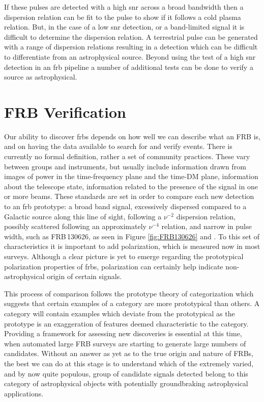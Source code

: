 \documentclass[a4paper,fleqn,usenatbib]{mnras}
\begin{document}
If these pulses are detected with a high \gls{snr} across a broad bandwidth then
a dispersion relation can be fit to the pulse to show if it follows a cold
plasma relation. But, in the case of a low \gls{snr} detection, or a
band-limited signal it is difficult to determine the dispersion relation. A
terrestrial pulse can be generated with a range of dispersion relations
resulting in a detection which can be difficult to differentiate from an
astrophysical source. Beyond using the test of a high \gls{snr} detection in an
\gls{frb} pipeline a number of additional tests can be done to verify a source
as astrophysical.

\section{FRB Verification}
\label{sec:verify_crit}

Our ability to discover \glspl{frb} depends on how well we can describe what an
FRB is, and on having the data available to search for and verify events. There
is currently no formal definition, rather a set of community practices. These
vary between groups and instruments, but usually include information drawn from
images of power in the time-frequency plane and the time-DM plane, information
about the telescope state, information related to the presence of the signal in
one or more beams.  These standards are set in order to compare each new
detection to an \gls{frb} prototype: a broad band signal, excessively dispersed
compared to a Galactic source along this line of sight, following a $\nu^{-2}$
dispersion relation, possibly scattered following an approximately $\nu^{-4}$
relation, and narrow in pulse width, such as FRB\,130626, as seen in Figure
\ref{fig:FRB130626} and \citet{2016MNRAS.460L..30C}. To this set of
characteristics it is important to add polarization, which is measured now in
most surveys. Although a clear picture is yet to emerge regarding the
prototypical polarization properties of \glspl{frb}, polarization can certainly
help indicate non-astrophysical origin of certain signals.

This process of comparison follows the prototype theory of categorization
\citep{ROSCH1976382} which suggests that certain examples of a category are more
prototypical than others. A category will contain examples which deviate from
the prototypical as the prototype is an exaggeration of features deemed
characteristic to the category. Providing a framework for assessing new
discoveries is essential at this time, when automated large FRB surveys are
starting to generate large numbers of candidates. Without an answer as yet as to
the true origin and nature of FRBs, the best we can do at this stage is to
understand which of the extremely varied, and by now quite populous, group of
candidate signals detected belong to this category of astrophysical objects with
potentially groundbraking astrophysical applications.
\end{document}
